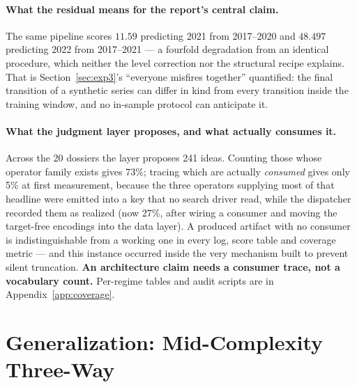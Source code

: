 \documentclass[11pt,a4paper]{article}
\begin{document}
\paragraph{What the residual means for the report's central claim.} The same pipeline scores $11.59$ predicting 2021 from 2017--2020 and $48.497$ predicting 2022 from 2017--2021 --- a fourfold degradation from an identical procedure, which neither the level correction nor the structural recipe explains. That is Section~\ref{sec:exp3}'s ``everyone misfires together'' quantified: the final transition of a synthetic series can differ in kind from every transition inside the training window, and no in-sample protocol can anticipate it.

\paragraph{What the judgment layer proposes, and what actually consumes it.} Across the 20
dossiers the layer proposes 241 ideas. Counting those whose operator family exists gives 73\%;
tracing which are actually \emph{consumed} gives only 5\% at first measurement, because the three operators supplying most of
that headline were emitted into a key that no search driver read, while the dispatcher recorded them as
realized (now 27\%, after wiring a consumer and moving the target-free encodings into the data
layer). A produced artifact with no consumer is indistinguishable from a working one in every
log, score table and coverage metric --- and this instance occurred inside the very mechanism
built to prevent silent truncation. \textbf{An architecture claim needs a consumer trace, not a
vocabulary count.} Per-regime tables and audit scripts are in Appendix~\ref{app:coverage}.

\section{Generalization: Mid-Complexity Three-Way}
\label{sec:exp7run2}
\end{document}
